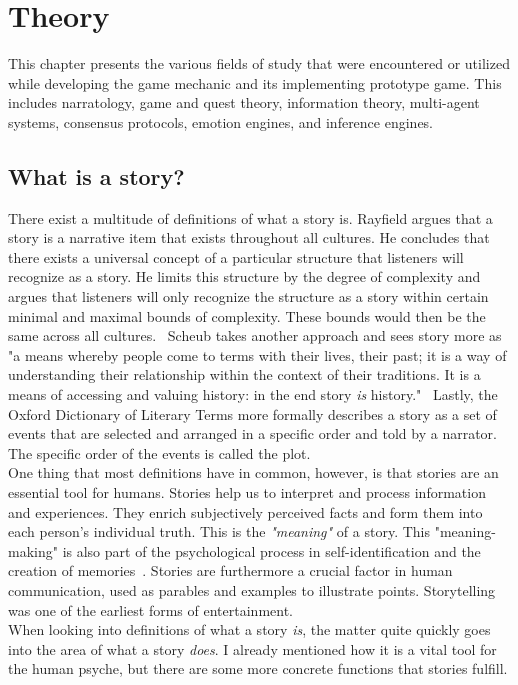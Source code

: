 \chapter{Theory} %
This chapter presents the various fields of study that were encountered or utilized while developing the game mechanic and its implementing prototype game. This includes narratology, game and quest theory, information theory, multi-agent systems, consensus protocols, emotion engines, and inference engines.
\section{What is a story?}
There exist a multitude of definitions of what a story is. Rayfield argues that a story is a narrative item that exists throughout all cultures. He concludes that there exists a universal concept of a particular structure that listeners will recognize as a story. He limits this structure by the degree of complexity and argues that listeners will only recognize the structure as a story within certain minimal and maximal bounds of complexity. These bounds would then be the same across all cultures.~\cite{Rayfield1972} Scheub takes another approach and sees story more as "a means whereby people come to terms with their lives, their past; it is a way of understanding their relationship within the context of their traditions. It is a means of accessing and valuing history: in the end story \textit{is} history."~\cite{Scheub1998} Lastly, the Oxford Dictionary of Literary Terms more formally describes a story as a set of events that are selected and arranged in a specific order and told by a narrator. The specific order of the events is called the plot.~\cite{Baldick1996}\\
One thing that most definitions have in common, however, is that stories are an essential tool for humans. Stories help us to interpret and process information and experiences. They enrich subjectively perceived facts and form them into each person's individual truth. This is the \textit{"meaning"} of a story. This "meaning-making" is also part of the psychological process in self-identification and the creation of memories~\cite{Flanagan1992}. Stories are furthermore a crucial factor in human communication, used as parables and examples to illustrate points. Storytelling was one of the earliest forms of entertainment.\\
When looking into definitions of what a story \textit{is}, the matter quite quickly goes into the area of what a story \textit{does}. I already mentioned how it is a vital tool for the human psyche, but there are some more concrete functions that stories fulfill.
